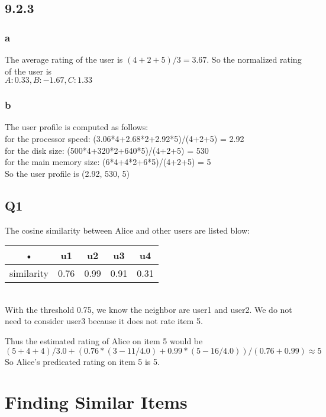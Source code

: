 \documentclass[paper=a4, fontsize=15pt]{article} %
\begin{document}
\subsection*{9.2.3}
\subsubsection*{a}
The average rating of the user is $(4+2+5)/3 =3.67 $. 
So the normalized rating of the user is\\ $A:0.33,B:-1.67,C:1.33$
\subsubsection*{b}
The user profile is computed as follows:\\
for the processor speed: (3.06*4+2.68*2+2.92*5)/(4+2+5) = 2.92\\
for the disk size: (500*4+320*2+640*5)/(4+2+5) = 530\\
for the main memory size: (6*4+4*2+6*5)/(4+2+5) = 5\\
So the user profile is (2.92, 530, 5)



\subsection*{Q1}
The cosine similarity between Alice and other users are listed blow:\\
\begin{tabular}{|c|c|c|c|c|}
\hline 
• & u1 & u2 & u3 & u4 \\ 
\hline 
similarity & 0.76 & 0.99 & 0.91 & 0.31 \\ 
\hline 
\end{tabular}
\\With the threshold 0.75, we know the neighbor are user1 and user2. We do not need to consider user3 because it does not rate item 5.

Thus the estimated rating of Alice on item 5 would be\\
$(5+4+4)/3.0 + (0.76*(3 - 11/4.0) + 0.99*(5 - 16/4.0))/(0.76+0.99) \approx 5$ \\
So Alice's predicated rating on item 5 is 5.







\section*{Finding Similar Items}
\end{document}
